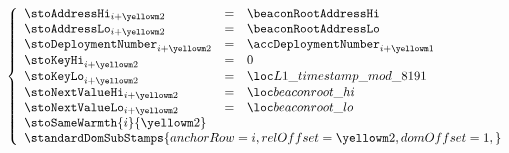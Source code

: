 \item[\underline{Storing the \inst{BEACONROOT} in the state:}] 
	\[
		\left\{ \begin{array}{lclr}
			\stoAddressHi         _{i + \roffTxSkipSysiBeaconRootSystemContractStorage} & = & \beaconRootAddressHi                        \\
			\stoAddressLo         _{i + \roffTxSkipSysiBeaconRootSystemContractStorage} & = & \beaconRootAddressLo                        \\
			\stoDeploymentNumber  _{i + \roffTxSkipSysiBeaconRootSystemContractStorage} & = & \accDeploymentNumber _{i + \roffTxSkipSysiBeaconRootSystemContractAccount} \\
			\stoKeyHi             _{i + \roffTxSkipSysiBeaconRootSystemContractStorage} & = & 0                                           \\
			\stoKeyLo             _{i + \roffTxSkipSysiBeaconRootSystemContractStorage} & = & \locLayerOneTimeStampModuloPrime            \\
			\stoNextValueHi       _{i + \roffTxSkipSysiBeaconRootSystemContractStorage} & = & \locBeaconRootHi                                               \\
			\stoNextValueLo       _{i + \roffTxSkipSysiBeaconRootSystemContractStorage} & = & \locBeaconRootLo                                               \\
			\multicolumn{3}{l}{\stoSameWarmth  {i}{\roffTxSkipSysiBeaconRootSystemContractStorage} } \\
			\multicolumn{3}{l}{
				\standardDomSubStamps {
					anchorRow = i                                              ,
					relOffset = \roffTxSkipSysiBeaconRootSystemContractStorage ,
					domOffset = 1                                              ,
				}} \\
		\end{array} \right.
	\]
